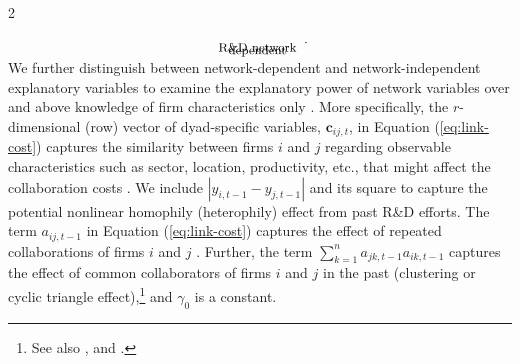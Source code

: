 \documentclass[12pt]{article}
\begin{document}
\begin{spacing}{2}
\begin{equation}
{}_{
\begin{array}{c}
\vspace{-0.35cm} \small \text{R\&D network} \\
\vspace{-0.35cm} \small \text{dependent}
\end{array}
}.
\label{eq:link-cost}
\end{equation}
We further distinguish between network-dependent and network-independent explanatory variables to examine the explanatory power of network variables over and above knowledge of firm characteristics only \citep{Ductor2011}. More specifically, the $r$-dimensional (row) vector of dyad-specific variables, $\mathbf{c}_{ij,t}$, in Equation (\ref{eq:link-cost}) captures the similarity between firms $i$ and $j$ regarding observable characteristics such as sector, location, productivity, etc., that might affect the collaboration costs \citep[see, e.g.,][]{Lychagin2010}. We include $|y_{i,t-1}-y_{j,t-1}|$ and its square to capture the potential nonlinear homophily (heterophily) effect from past R\&D efforts. %
The term $a_{ij,t-1}$ in Equation (\ref{eq:link-cost}) captures the effect of repeated collaborations of firms $i$ and $j$ \citep[][]{Fafchamps2010,goerzen2007alliance}. Further, the term $ \sum_{k=1}^n a_{jk,t-1} a_{ik,t-1}$ captures the effect of common collaborators of firms $i$ and $j$ in the past (clustering or cyclic triangle effect),\footnote{See also \citet[][]{hanaki10:_dynam_of_r_d_networ}, \citet[][]{Mele2010} and \citet[][]{Fafchamps2010}.} and $\gamma_0$ is a constant.


\end{spacing}
\end{document}
